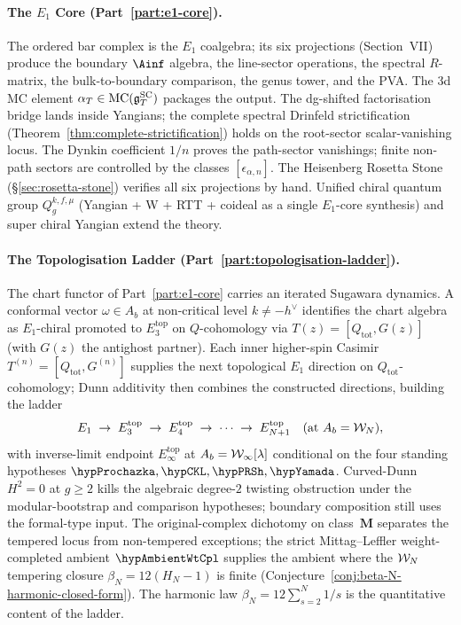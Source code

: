\paragraph{The $E_1$ Core (Part~\ref{part:e1-core}).}
The ordered bar complex is the $E_1$ coalgebra; its six
projections (Section~VII) produce the boundary $\Ainf$ algebra,
the line-sector operations, the spectral $R$-matrix, the
bulk-to-boundary comparison, the genus tower, and the PVA. The
3d MC element $\alpha_T \in \operatorname{MC}(\mathfrak{g}^{\mathrm{SC}}_T)$ packages the output.
The dg-shifted factorisation bridge lands inside Yangians; the
complete spectral Drinfeld strictification
(Theorem~\ref{thm:complete-strictification}) holds on the
root-sector scalar-vanishing locus. The Dynkin coefficient $1/n$
proves the path-sector vanishings; finite non-path sectors are
controlled by the classes $[\epsilon_{\alpha,n}]$.
The Heisenberg Rosetta Stone (\S\ref{sec:rosetta-stone})
verifies all six projections by hand. Unified chiral quantum
group $Q_g^{k,f,\mu}$ (Yangian + W + RTT + coideal as a single
$E_1$-core synthesis) and super chiral Yangian extend the theory.

\paragraph{The Topologisation Ladder
(Part~\ref{part:topologisation-ladder}).}
The chart functor of Part~\ref{part:e1-core} carries an iterated
Sugawara dynamics. A conformal vector $\omega \in A_b$ at non-critical
level $k \ne -h^\vee$ identifies the chart algebra as $E_1$-chiral
promoted to $E_3^{\mathrm{top}}$ on $Q$-cohomology via
$T(z) = [Q_{\mathrm{tot}}, G(z)]$ \textup{(}with $G(z)$ the
antighost partner\textup{)}. Each inner higher-spin Casimir
$T^{(n)} = [Q_{\mathrm{tot}}, G^{(n)}]$ supplies the next
topological $E_1$ direction on $Q_{\mathrm{tot}}$-cohomology; Dunn
additivity then combines the constructed directions, building the
ladder
\[
E_1 \;\to\; E_3^{\mathrm{top}} \;\to\; E_4^{\mathrm{top}} \;\to\; \cdots
 \;\to\; E_{N+1}^{\mathrm{top}}
 \quad (\text{at } A_b = \mathcal{W}_N),
\]
with inverse-limit endpoint
$E_\infty^{\mathrm{top}}$ at $A_b = \mathcal{W}_\infty[\lambda]$ conditional
on the four standing hypotheses
$\hypProchazka, \hypCKL, \hypPRSh, \hypYamada$. Curved-Dunn
$H^2 = 0$ at $g \ge 2$ kills the algebraic degree-$2$ twisting
obstruction under the modular-bootstrap and comparison hypotheses;
boundary composition still uses the formal-type input. The
original-complex dichotomy on class~$\mathbf{M}$ separates
the tempered locus from non-tempered exceptions; the strict
Mittag--Leffler weight-completed ambient $\hypAmbientWtCpl$
supplies the ambient where the $\mathcal{W}_N$ tempering closure
$\beta_N = 12(H_N - 1)$ is finite
\textup{(}Conjecture~\ref{conj:beta-N-harmonic-closed-form}\textup{)}.
The harmonic law $\beta_N = 12 \sum_{s = 2}^N 1/s$ is the
quantitative content of the ladder.

